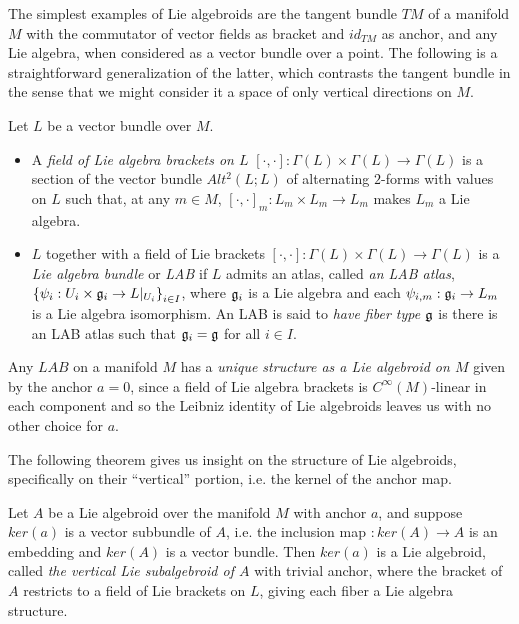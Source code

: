 \linea 

The simplest examples of Lie algebroids are the tangent bundle $TM$ of a manifold $M$ with the commutator of vector fields as bracket and $id_{TM}$ as anchor, and any Lie algebra, when considered as a vector bundle over a point. The following is a straightforward generalization of the latter, which contrasts the tangent bundle in the sense that we might consider it a space of only vertical directions on $M$.

\begin{definition}[LAB]\label{defnLAB}
    Let $L$ be a vector bundle over $M$.
    
    \begin{itemize}
    
    \item A \emph{field of Lie algebra brackets on $L$} $[\cdot, \cdot]:\Gamma(L) \times \Gamma(L) \to \Gamma(L)$ is a section of the vector bundle $Alt^2(L; L)$ of alternating $2$-forms with values on $L$ such that, at any $m \in M$, $[\cdot, \cdot]_m:L_m \times L_m \to L_m$ makes $L_m$ a Lie algebra.
    
    \item $L$ together with a field of Lie brackets $[\cdot, \cdot]:\Gamma(L) \times \Gamma(L) \to \Gamma(L)$ is a \emph{Lie algebra bundle} or \emph{LAB} if $L$ admits an atlas, called \emph{an LAB atlas}, $\left\{ \psi_i: U_i \times \mathfrak{g}_i \to L|_{U_i} \right\}_{i \in I}$, where $\mathfrak{g}_i$ is a Lie algebra and each $\psi_{i, m}: \mathfrak{g}_i \to L_m$ is a Lie algebra isomorphism. An LAB is said to \emph{have fiber type $\mathfrak{g}$} is there is an LAB atlas such that $\mathfrak{g}_i = \mathfrak{g}$ for all $i \in I$.
    
    \end{itemize}
    
\end{definition}

Any $LAB$ on a manifold $M$ has a \emph{unique structure as a Lie algebroid on $M$} given by the anchor $a = 0$, since a field of Lie algebra brackets is $C^\infty(M)$-linear in each component and so the Leibniz identity of Lie algebroids leaves us with no other choice for $a$.

The following theorem gives us insight on the structure of Lie algebroids, specifically on their ``vertical'' portion, i.e. the kernel of the anchor map.

\begin{theorem} \label{theoFiberLie}
Let $A$ be a Lie algebroid over the manifold $M$ with anchor $a$, and suppose $ker(a)$ is a vector subbundle of $A$, i.e. the inclusion map $:ker(A) \to A$ is an embedding and $ker(A)$ is a vector bundle. Then $ker(a)$ %
is a Lie algebroid, called \emph{the vertical Lie subalgebroid of $A$} with trivial anchor, where the bracket of $A$ restricts to a field of Lie brackets on $L$, giving each fiber a Lie algebra structure.
\end{theorem}

